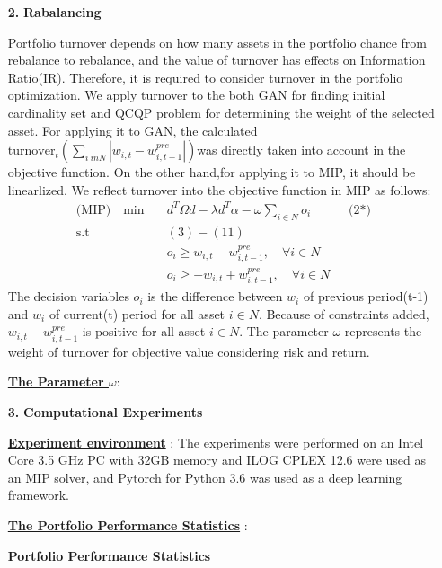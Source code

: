 \documentclass[11pt]{article}
\begin{document}
\begin{itemize}
	\item[\textbf{2.}] \textbf{Rabalancing}
	\item[]Portfolio turnover depends on how many assets in the portfolio chance from rebalance to rebalance, and the value of turnover has effects on Information Ratio(IR). Therefore, it is required to consider turnover in the portfolio optimization. We apply turnover to the both GAN for finding initial cardinality set and QCQP problem for determining the weight of the selected asset. For applying it to GAN, the calculated $\text{turnover}_{t} (\sum_{i \ inN}|w_{i,t}-w_{i,t-1}^{pre}|)$was directly taken into account in the objective function. On the other hand,for applying it to MIP, it should be linearlized. We reflect turnover into the objective function in MIP as follows: 
	\begin{align*}
	\text{(MIP)} \quad \min \quad & d^T\Omega d  -  \lambda d^{T}\alpha - \omega \sum_{i \in N}o_i \quad  \quad \quad\text{(2*)}\\
	\text{s.t } \quad & (3) - (11)\\
	& o_i \geq w_{i,t}-w_{i,t-1}^{pre}, \quad \forall{i \in N} \\
	& o_i \geq -w_{i,t}+w_{i,t-1}^{pre}, \quad \forall{i \in N} 
	\end{align*}
	The decision variables $o_i$ is the difference between $w_i$ of previous period(t-1) and $w_i$ of current(t) period for all asset $i \in N$. Because of constraints added, $ w_{i,t}-w_{i,t-1}^{pre}$ is positive for all asset $i \in N$. The parameter $\omega$ represents the weight of turnover for objective value considering risk and return. 
	\item[] \underline{\textbf{The Parameter $ \omega$}}: 
	
	\item[\textbf{3.}] \textbf{Computational Experiments}
	\item[] \underline{\textbf{Experiment environment}} : The experiments were performed on an Intel Core 3.5 GHz PC with 32GB memory and ILOG CPLEX 12.6 were used as an MIP solver, and Pytorch for Python 3.6 was used as a deep learning framework. 
	
	
	\item[] \underline{\textbf{The Portfolio Performance Statistics}} : 
		\begin{center}
			\textbf{Portfolio Performance Statistics}\vspace*{-14pt}
		\end{center}
	

\end{itemize}
\end{document}
